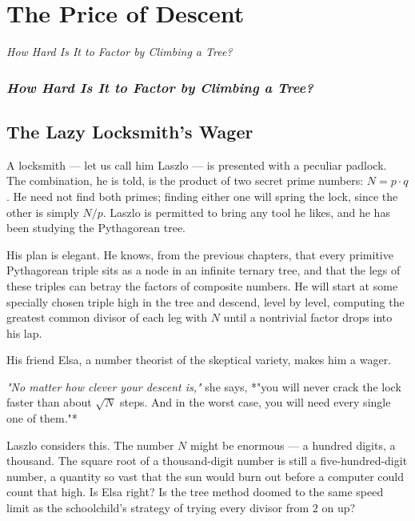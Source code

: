 \chapter{The Price of Descent}

\begin{center}\textit{How Hard Is It to Factor by Climbing a Tree?}\end{center}
\bigskip

\subsection*{\textit{How Hard Is It to Factor by Climbing a Tree?}}

\bigskip

\section*{The Lazy Locksmith's Wager}

A locksmith --- let us call him Laszlo --- is presented with a peculiar padlock. The combination, he is told, is the product of two secret prime numbers: $N = p \cdot q$. He need not find both primes; finding either one will spring the lock, since the other is simply $N / p$. Laszlo is permitted to bring any tool he likes, and he has been studying the Pythagorean tree.

His plan is elegant. He knows, from the previous chapters, that every primitive Pythagorean triple sits as a node in an infinite ternary tree, and that the legs of these triples can betray the factors of composite numbers. He will start at some specially chosen triple high in the tree and descend, level by level, computing the greatest common divisor of each leg with $N$ until a nontrivial factor drops into his lap.

His friend Elsa, a number theorist of the skeptical variety, makes him a wager.


\begin{displayquote}
\textit{"No matter how clever your descent is,"} she says, *"you will never crack the lock faster than about $\sqrt{N}$ steps. And in the worst case, you will need every single one of them."*
\end{displayquote}


Laszlo considers this. The number $N$ might be enormous --- a hundred digits, a thousand. The square root of a thousand-digit number is still a five-hundred-digit number, a quantity so vast that the sun would burn out before a computer could count that high. Is Elsa right? Is the tree method doomed to the same speed limit as the schoolchild's strategy of trying every divisor from $2$ on up?

